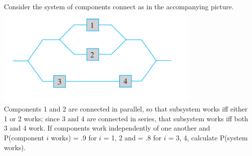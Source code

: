 \documentclass[12pt,letterpaper]{hmcpset}
\begin{document}
\begin{solution}

\end{solution}
\newpage

\begin{problem}[2.5.80]
Consider the system of components connect as in the accompanying picture.
\includegraphics[scale=1]{Nov_3_2.png}\\
    Components 1 and 2 are connected in parallel, so that subsystem works iff either 1 or 2 works; since 3 and 4 are connected in series, that subsystem works iff both 3 and 4 work. If components work independently of one another and P(component $i$ works) = .9 for $i$ = 1, 2 and = .8 for $i$ = 3, 4, calculate P(system works).
\\
\end{problem}

\begin{solution}

\end{solution}
\end{document}
